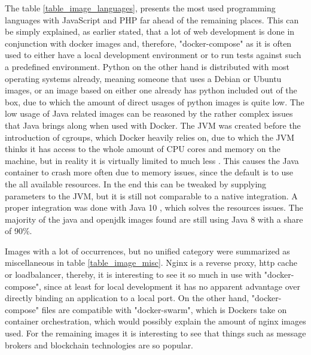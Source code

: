 The table \ref{table_image_languages}, presents the most used programming languages with JavaScript and PHP far ahead of the remaining places. This can be simply explained, as earlier stated, that a lot of web development is done in conjunction with docker images and, therefore, "docker-compose" as it is often used to either have a local development environment or to run tests against such a predefined environment. Python on the other hand is distributed with most operating systems already, meaning someone that uses a Debian or Ubuntu images, or an image based on either one already has python included out of the box, due to which the amount of direct usages of python images is quite low.
The low usage of Java related images can be reasoned by the rather complex issues that Java brings along when used with Docker. The JVM was created before the introduction of cgroups, which Docker heavily relies on, due to which the JVM thinks it has access to the whole amount of CPU cores and memory on the machine, but in reality it is virtually limited to much less . This causes the Java container to crash more often due to memory issues, since the default is to use the all available resources. In the end this can be tweaked by supplying parameters to the JVM, but it is still not comparable to a native integration. A proper integration was done with Java 10 , which solves the resources issues. The majority of the java and openjdk images found are still using Java 8 with a share of 90\%.

Images with a lot of occurrences, but no unified category were summarized as miscellaneous in table \ref{table_image_misc}. Nginx is a reverse proxy, http cache or loadbalancer, thereby, it is interesting to see it so much in use with "docker-compose", since at least for local development it has no apparent advantage over directly binding an application to a local port. On the other hand, "docker-compose" files are compatible with "docker-swarm", which is Dockers take on container orchestration, which would possibly explain the amount of nginx images used.
For the remaining images it is interesting to see that things such as message brokers and blockchain technologies are so popular.

